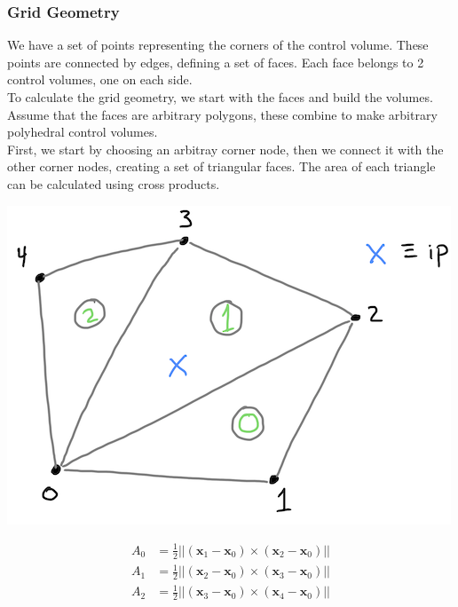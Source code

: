 \documentclass[11pt]{article}
\begin{document}
\subsubsection{Grid Geometry}
\label{sec:orgda1806c}
We have a set of points representing the corners of the control volume. These points are connected by
edges, defining a set of faces. Each face belongs to 2 control volumes, one on each side.\\

To calculate the grid geometry, we start with the faces and build the volumes. Assume that the faces are
arbitrary polygons, these combine to make arbitrary polyhedral control volumes.\\

First, we start by choosing an arbitray corner node, then we connect it with the other corner nodes,
creating a set of triangular faces. The area of each triangle can be calculated using cross products.\\

\begin{center}
\includegraphics[scale=1.5]{../pic/SubFaces.png}
\end{center}


\begin{equation*}
\begin{aligned}
A_0 &= \frac{1}{2} || (\textbf{x}_1 - \textbf{x}_0) \times (\textbf{x}_2 - \textbf{x}_0) ||\\
A_1 &= \frac{1}{2} || (\textbf{x}_2 - \textbf{x}_0) \times (\textbf{x}_3 - \textbf{x}_0) ||\\
A_2 &= \frac{1}{2} || (\textbf{x}_3 - \textbf{x}_0) \times (\textbf{x}_4 - \textbf{x}_0) ||
\end{aligned}
\end{equation*}    
\end{document}
